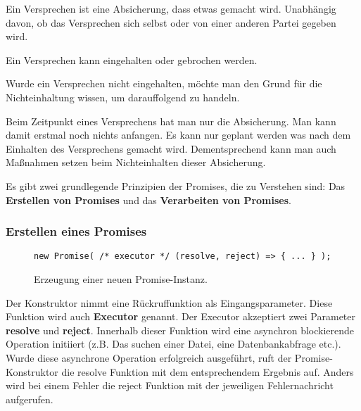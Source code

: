 \begin{description}
    \item Ein Versprechen ist eine Absicherung, dass etwas gemacht wird. Unabhängig davon, ob das Versprechen sich selbst oder von einer anderen Partei gegeben wird.
    
    \item Ein Versprechen kann eingehalten oder gebrochen werden.
    
    \item Wurde ein Versprechen nicht eingehalten, möchte man den Grund für die Nichteinhaltung wissen, um darauffolgend zu handeln.
    
    \item Beim Zeitpunkt eines Versprechens hat man nur die Absicherung. Man kann damit erstmal noch nichts anfangen. Es kann nur geplant werden was nach dem Einhalten des Versprechens gemacht wird. Dementsprechend kann man auch Maßnahmen setzen beim Nichteinhalten dieser Absicherung.
    
\end{description}

\noindent
Es gibt zwei grundlegende Prinzipien der Promises, die zu Verstehen sind: Das \textbf{Erstellen von Promises} und das \textbf{Verarbeiten von Promises}.

\subsubsection{Erstellen eines Promises}

\begin{figure}[H]
\begin{lstlisting}[basicstyle=\small]
new Promise( /* executor */ (resolve, reject) => { ... } );
\end{lstlisting}
\caption{Erzeugung einer neuen Promise-Instanz.}
\end{figure}

Der Konstruktor nimmt eine Rückruffunktion als Eingangsparameter. Diese Funktion wird auch \textbf{Executor} genannt\cite{promise-executor}. Der Executor akzeptiert zwei Parameter \textbf{resolve} und \textbf{reject}. Innerhalb dieser Funktion wird eine asynchron blockierende Operation initiiert (z.B. Das suchen einer Datei, eine Datenbankabfrage etc.). Wurde diese asynchrone Operation erfolgreich ausgeführt, ruft der Promise-Konstruktor die resolve Funktion mit dem entsprechendem Ergebnis auf. Anders wird bei einem Fehler die reject Funktion mit der jeweiligen Fehlernachricht aufgerufen.


